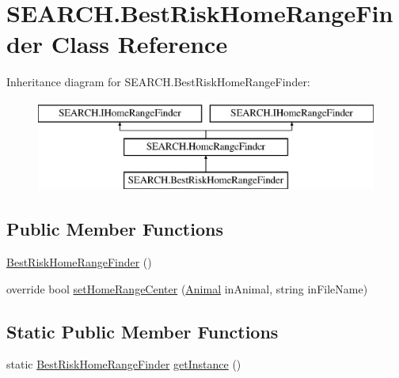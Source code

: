 \hypertarget{class_s_e_a_r_c_h_1_1_best_risk_home_range_finder}{\section{S\-E\-A\-R\-C\-H.\-Best\-Risk\-Home\-Range\-Finder Class Reference}
\label{class_s_e_a_r_c_h_1_1_best_risk_home_range_finder}
}


 


Inheritance diagram for S\-E\-A\-R\-C\-H.\-Best\-Risk\-Home\-Range\-Finder\-:\begin{figure}[H]
\begin{center}
\leavevmode
\includegraphics[height=3.000000cm]{class_s_e_a_r_c_h_1_1_best_risk_home_range_finder}
\end{center}
\end{figure}
\subsection*{Public Member Functions}
\begin{DoxyCompactItemize}
\item 
\hyperlink{class_s_e_a_r_c_h_1_1_best_risk_home_range_finder_af55769ce11dc9fd833dcab8c152bd47f}{Best\-Risk\-Home\-Range\-Finder} ()
\item 
override bool \hyperlink{class_s_e_a_r_c_h_1_1_best_risk_home_range_finder_a90867156ad508254624d441fb9116d65}{set\-Home\-Range\-Center} (\hyperlink{class_s_e_a_r_c_h_1_1_animal}{Animal} in\-Animal, string in\-File\-Name)
\end{DoxyCompactItemize}
\subsection*{Static Public Member Functions}
\begin{DoxyCompactItemize}
\item 
static \hyperlink{class_s_e_a_r_c_h_1_1_best_risk_home_range_finder}{Best\-Risk\-Home\-Range\-Finder} \hyperlink{class_s_e_a_r_c_h_1_1_best_risk_home_range_finder_a1f6df4f3d21ccae467fd4335661da4ae}{get\-Instance} ()
\end{DoxyCompactItemize}
